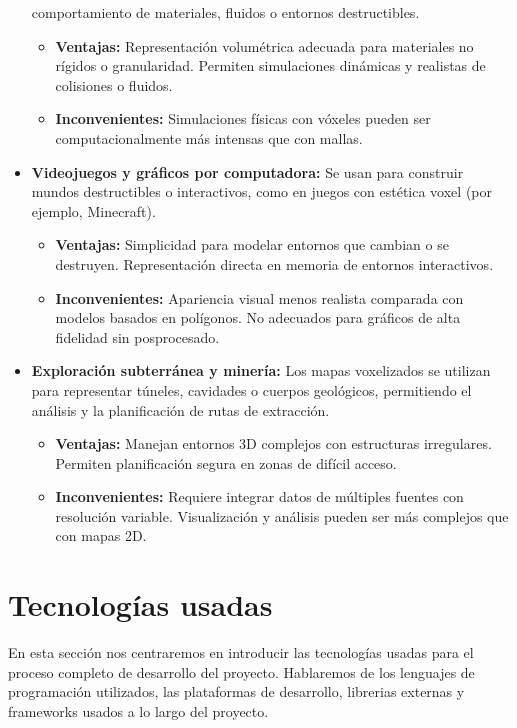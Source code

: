 \documentclass[12pt, a4paper, twoside]{article}
\begin{document}
\begin{itemize}
  comportamiento de materiales, fluidos o entornos destructibles.
  \begin{itemize}
    \item \textbf{Ventajas:} Representación volumétrica adecuada para materiales no rígidos o granularidad. Permiten simulaciones 
    dinámicas y realistas de colisiones o fluidos.
    \item \textbf{Inconvenientes:} Simulaciones físicas con vóxeles pueden ser computacionalmente más intensas que con mallas.
  \end{itemize}
  \item \textbf{Videojuegos y gráficos por computadora:} Se usan para construir mundos destructibles o interactivos, como en 
  juegos con estética voxel (por ejemplo, Minecraft).
  \begin{itemize}
    \item \textbf{Ventajas:} Simplicidad para modelar entornos que cambian o se destruyen. Representación directa en memoria 
    de entornos interactivos.
    \item \textbf{Inconvenientes:} Apariencia visual menos realista comparada con modelos basados en polígonos. No adecuados 
    para gráficos de alta fidelidad sin posprocesado.
  \end{itemize}
  \item \textbf{Exploración subterránea y minería:} Los mapas voxelizados se utilizan para representar túneles, cavidades o 
  cuerpos geológicos, permitiendo el análisis y la planificación de rutas de extracción.
  \begin{itemize}
    \item \textbf{Ventajas:} Manejan entornos 3D complejos con estructuras irregulares. Permiten planificación segura en 
    zonas de difícil acceso.
    \item \textbf{Inconvenientes:} Requiere integrar datos de múltiples fuentes con resolución variable. Visualización y 
    análisis pueden ser más complejos que con mapas 2D.
  \end{itemize}
\end{itemize}

\section{Tecnologías usadas}
En esta sección nos centraremos en introducir las tecnologías usadas para el proceso completo de desarrollo del proyecto. 
Hablaremos de los lenguajes de programación utilizados, las plataformas de desarrollo, librerias externas y frameworks usados
a lo largo del proyecto.
\end{document}
